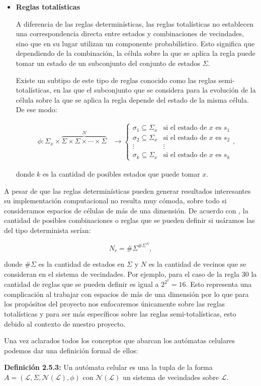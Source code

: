 \begin{itemize}
    \item \textbf{Reglas totalísticas}
    
    A diferencia de las reglas determinísticas, las reglas totalísticas no establecen una correspondencia directa entre estados y combinaciones de vecindades, sino que en su lugar utilizan un componente probabilístico. Esto significa que dependiendo de la combinación, la célula sobre la que se aplica la regla puede tomar un estado de un subconjunto del conjunto de estados $\Sigma$. 
    
    Existe un subtipo de este tipo de reglas conocido como las reglas semi-totalísticas, en las que el subconjunto que se considera para la evolución de la célula sobre la que se aplica la regla depende del estado de la misma célula. De ese modo:
    
    \begin{align*}
        \phi:\Sigma_x\times\overbrace{\Sigma\times\Sigma\times\cdots\times\Sigma}^{N}&\longrightarrow \left\{ \begin{array}{cc}
        \sigma_1 \subseteq \Sigma_x & \text{si el estado de }x\text{ es }s_1 \\
        \sigma_2 \subseteq \Sigma_x & \text{si el estado de }x\text{ es }s_2 \\
        \vdots & \vdots \\
        \sigma_k \subseteq \Sigma_x & \text{si el estado de }x\text{ es }s_k
        \end{array} \right. ,
    \end{align*}
    
    donde $k$ es la cantidad de posibles estados que puede tomar $x$.
\end{itemize}

A pesar de que las reglas determinísticas pueden generar resultados interesantes su implementación computacional no resulta muy cómoda, sobre todo si consideramos espacios de células de más de una dimensión. De acuerdo con \cite{alfons2010}, la cantidad de posibles combinaciones o reglas que se pueden definir si usáramos las del tipo determinista serían:

$$N_r=\#\Sigma^{\#\Sigma^N},$$

donde $\#\Sigma$ es la cantidad de estados en $\Sigma$ y $N$ es la cantidad de vecinos que se consideran en el sistema de vecindades. Por ejemplo, para el caso de la regla 30 la cantidad de reglas que se pueden definir es igual a $2^{2^2}=16$. Esto representa una complicación al trabajar con espacios de más de una dimensión por lo que para los propósitos del proyecto nos enfocaremos únicamente sobre las reglas totalísticas y para ser más específicos sobre las reglas semi-totalísticas, esto debido al contexto de nuestro proyecto.

Una vez aclarados todos los conceptos que abarcan los autómatas celulares podemos dar una definición formal de ellos:

\textbf{Definición 2.5.3:} Un autómata celular es una la tupla de la forma  $A=(\mathcal{L},\Sigma,\mathcal{N}(\mathcal{L}),\phi)$ con $\mathcal{N}(\mathcal{L})$ un sistema de vecindades sobre $\mathcal{L}$.
